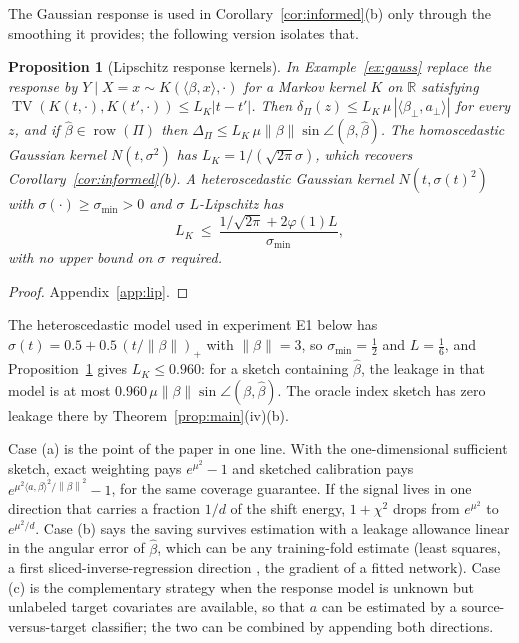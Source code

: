\documentclass[11pt,a4paper]{article}
\newcommand{\norm}[1]{\left\|#1\right\|}
\newcommand{\R}{\mathbb{R}}
\newcommand{\TV}{\operatorname{TV}}
\theoremstyle{plain}
\newtheorem{proposition}[theorem]{Proposition}
\theoremstyle{definition}
\theoremstyle{remark}
\begin{document}
The Gaussian response is used in Corollary~\ref{cor:informed}(b) only through the smoothing it provides; the following version isolates that.
\begin{proposition}[Lipschitz response kernels]\label{prop:lip}
In Example~\ref{ex:gauss} replace the response by $Y\mid X=x\sim K(\langle\beta,x\rangle,\cdot)$ for a Markov kernel $K$ on $\R$ satisfying $\TV(K(t,\cdot),K(t',\cdot))\le L_K|t-t'|$. Then $\delta_\Pi(z)\le L_K\,\mu\,|\langle\beta_\perp,a_\perp\rangle|$ for every $z$, and if $\hat\beta\in\operatorname{row}(\Pi)$ then $\Delta_\Pi\le L_K\,\mu\norm\beta\sin\angle(\beta,\hat\beta)$. The homoscedastic Gaussian kernel $N(t,\sigma^2)$ has $L_K=1/(\sqrt{2\pi}\sigma)$, which recovers Corollary~\ref{cor:informed}(b). A heteroscedastic Gaussian kernel $N(t,\sigma(t)^2)$ with $\sigma(\cdot)\ge\sigma_{\min}>0$ and $\sigma$ $L$-Lipschitz has
\[
L_K\ \le\ \frac{1/\sqrt{2\pi}+2\varphi(1)L}{\sigma_{\min}} ,
\]
with no upper bound on $\sigma$ required.
\end{proposition}
\begin{proof}
Appendix~\ref{app:lip}.
\end{proof}

The heteroscedastic model used in experiment E1 below has $\sigma(t)=0.5+0.5\,(t/\norm\beta)_+$ with $\norm\beta=3$, so $\sigma_{\min}=\tfrac12$ and $L=\tfrac16$, and Proposition~\ref{prop:lip} gives $L_K\le0.960$: for a sketch containing $\hat\beta$, the leakage in that model is at most $0.960\,\mu\norm\beta\sin\angle(\beta,\hat\beta)$. The oracle index sketch has zero leakage there by Theorem~\ref{prop:main}(iv)(b).

Case (a) is the point of the paper in one line. With the one-dimensional sufficient sketch, exact weighting pays $e^{\mu^2}-1$ and sketched calibration pays $e^{\mu^2\langle a,\beta\rangle^2/\norm\beta^2}-1$, for the same coverage guarantee. If the signal lives in one direction that carries a fraction $1/d$ of the shift energy, $1+\chi^2$ drops from $e^{\mu^2}$ to $e^{\mu^2/d}$. Case (b) says the saving survives estimation with a leakage allowance linear in the angular error of $\hat\beta$, which can be any training-fold estimate (least squares, a first sliced-inverse-regression direction \cite{li1991}, the gradient of a fitted network). Case (c) is the complementary strategy when the response model is unknown but unlabeled target covariates are available, so that $a$ can be estimated by a source-versus-target classifier; the two can be combined by appending both directions.
\end{document}
